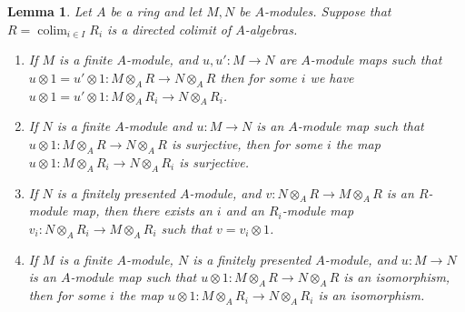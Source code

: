 \documentclass[10pt,a4paper]{amsart}
\theoremstyle{plain}
\newtheorem{lemma}[subsection]{Lemma}
\theoremstyle{definition}
\theoremstyle{remark}
\numberwithin{equation}{subsection}
\def\colim{\mathop{\mathrm{colim}}\nolimits}
\begin{document}
\begin{lemma}
\label{lemma-module-map-property-in-colimit}
Let $A$ be a ring and let $M, N$ be $A$-modules.
Suppose that $R = \colim_{i \in I} R_i$ is a directed colimit
of $A$-algebras.
\begin{enumerate}
\item If $M$ is a finite $A$-module, and $u, u' : M \to N$ are
$A$-module maps such that
$u \otimes 1 = u' \otimes 1 : M \otimes_A R \to N \otimes_A R$
then for some $i$ we have
$u \otimes 1 = u' \otimes 1 : M \otimes_A R_i \to N \otimes_A R_i$.
\item If $N$ is a finite $A$-module and $u : M \to N$ is an $A$-module
map such that $u \otimes 1 : M \otimes_A R \to N \otimes_A R$ is surjective,
then for some $i$ the map $u \otimes 1 : M \otimes_A R_i \to N \otimes_A R_i$
is surjective.
\item If $N$ is a finitely presented $A$-module, and
$v : N \otimes_A R \to M \otimes_A R$ is an $R$-module
map, then there exists an $i$ and an $R_i$-module map
$v_i : N \otimes_A R_i \to M \otimes_A R_i$ such that $v = v_i \otimes 1$.
\item If $M$ is a finite $A$-module, $N$ is a finitely presented $A$-module,
and $u : M \to N$ is an $A$-module map such that
$u \otimes 1 : M \otimes_A R \to N \otimes_A R$ is an isomorphism, then
for some $i$ the map $u \otimes 1 : M \otimes_A R_i \to N \otimes_A R_i$
is an isomorphism.
\end{enumerate}
\end{lemma}
\end{document}
